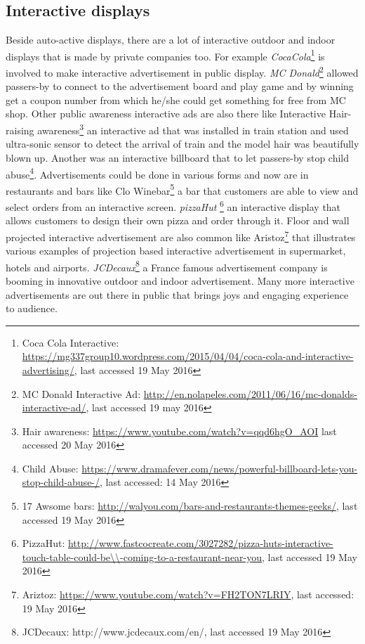 \subsection{Interactive displays}
Beside auto-active displays, there are a lot of interactive outdoor and indoor displays that is made by private companies too. For example  \emph{CocaCola}\footnote{Coca Cola Interactive: \url{https://mg337group10.wordpress.com/2015/04/04/coca-cola-and-interactive-advertising/}, last accessed 19 May 2016} is involved to make interactive advertisement in public display. \emph{MC Donald}\footnote{MC Donald Interactive Ad: \url{http://en.nolapeles.com/2011/06/16/mc-donalds-interactive-ad/}, last accessed 19 may 2016} allowed passers-by to connect to the advertisement board and play game and by winning get a coupon number from which he/she could get something for free from MC shop. Other public awareness interactive ads are also there like Interactive Hair-raising awareness\footnote{Hair awareness: \url{https://www.youtube.com/watch?v=qqd6hgO_AOI} last accessed 20 May 2016} an interactive ad that was installed in train station and used ultra-sonic sensor to detect the arrival of train and the model hair was beautifully blown up. Another was an interactive billboard that to let passers-by stop child abuse\footnote{Child Abuse: \url{https://www.dramafever.com/news/powerful-billboard-lets-you-stop-child-abuse-/}, last accessed: 14 May 2016}. Advertisements could be done in various forms and now are in restaurants and bars like Clo Winebar\footnote{17 Awsome bars: \url{http://walyou.com/bars-and-restaurants-themes-geeks/}, last accessed 19 May 2016} a bar that customers are able to view and select orders from an interactive screen. \emph{pizzaHut} \footnote{PizzaHut: \url{http://www.fastcocreate.com/3027282/pizza-huts-interactive-touch-table-could-be\\-coming-to-a-restaurant-near-you}, last accessed 19 May 2016} an interactive display that allows customers to design their own pizza and order through it. Floor and wall projected interactive advertisement are also common like Aristoz\footnote{Ariztoz: \url{https://www.youtube.com/watch?v=FH2TON7LRIY}, last accessed: 19 May 2016} that illustrates various examples of projection based interactive advertisement in supermarket, hotels and airports. \emph{JCDecaux}\footnote{JCDecaux: http://www.jcdecaux.com/en/, last accessed 19 May 2016} a France famous advertisement company is booming in innovative outdoor and indoor advertisement. Many more interactive advertisements are out there in public that brings joys and engaging experience to audience.  


